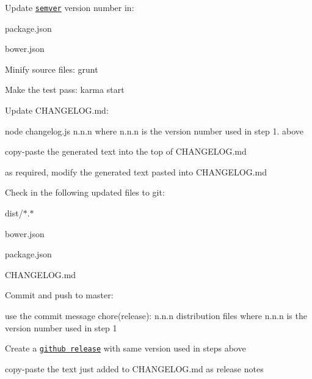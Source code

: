 
\begin{DoxyEnumerate}
\item Update \href{http://semver.org/}{\tt semver} version number in\+:
\begin{DoxyItemize}
\item package.\+json
\item bower.\+json
\end{DoxyItemize}
\item Minify source files\+: {\ttfamily grunt}
\item Make the test pass\+: {\ttfamily karma start}
\item Update C\+H\+A\+N\+G\+E\+L\+O\+G.\+md\+:
\begin{DoxyEnumerate}
\item {\ttfamily node changelog.\+js n.\+n.\+n} where {\ttfamily n.\+n.\+n} is the version number used in step 1. above
\item copy-\/paste the generated text into the top of C\+H\+A\+N\+G\+E\+L\+O\+G.\+md
\item as required, modify the generated text pasted into C\+H\+A\+N\+G\+E\+L\+O\+G.\+md
\end{DoxyEnumerate}
\item Check in the following updated files to git\+:
\begin{DoxyItemize}
\item dist/$\ast$.$\ast$
\item bower.\+json
\item package.\+json
\item C\+H\+A\+N\+G\+E\+L\+O\+G.\+md
\end{DoxyItemize}
\item Commit and push to master\+:
\begin{DoxyItemize}
\item use the commit message \textquotesingle{}chore(release)\+: n.\+n.\+n distribution files\textquotesingle{} where \textquotesingle{}n.\+n.\+n\textquotesingle{} is the version number used in step 1
\end{DoxyItemize}
\item Create a \href{https://help.github.com/articles/creating-releases/}{\tt github release} with same version used in steps above
\begin{DoxyItemize}
\item copy-\/paste the text just added to C\+H\+A\+N\+G\+E\+L\+O\+G.\+md as release notes 
\end{DoxyItemize}
\end{DoxyEnumerate}
